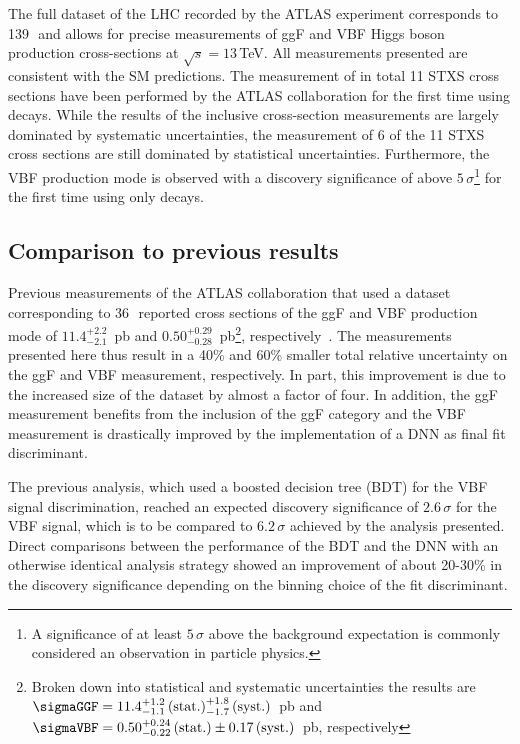 The full \RunTwo dataset of the LHC recorded by the ATLAS experiment corresponds to 139\,\ifb\ and allows for precise measurements of ggF and VBF Higgs boson production cross-sections at $\sqrt{s} = 13\,$TeV.
All measurements presented are consistent with the SM predictions. 
The measurement of in total 11 STXS cross sections have been performed by the ATLAS collaboration for the first time using \HWW decays. 
While the results of the inclusive cross-section measurements are largely dominated by systematic uncertainties, the measurement of 6 of the 11 STXS cross sections are still dominated by statistical uncertainties. 
Furthermore, the VBF production mode is observed with a discovery significance of above $5\,\sigma$\footnote{A significance of at least $5\,\sigma$ above the background expectation is commonly considered an observation in particle physics.} for the first time using only \HWW decays.

\subsection{Comparison to previous results}
Previous \RunTwo measurements of the ATLAS collaboration that used a dataset corresponding to 36\,\ifb\ reported cross sections of the ggF and VBF production mode of $11.4^{+2.2}_{-2.1}$~pb and $0.50^{+0.29}_{-0.28}$~pb\footnote{Broken down into statistical and systematic uncertainties the results are $\sigmaGGF = 11.4^{+1.2}_{-1.1}\,\text{(stat.)}^{+1.8}_{-1.7}\,\text{(syst.)}$~pb and $\sigmaVBF= 0.50^{+0.24}_{-0.22}\,\text{(stat.)}\pm 0.17\,\text{(syst.)}$~pb, respectively}, respectively~\cite{HIGG-2016-07}.
The measurements presented here thus result in a 40\% and 60\% smaller total relative uncertainty on the ggF and VBF measurement, respectively. In part, this improvement is due to the increased size of the dataset by almost a factor of four.
In addition, the ggF measurement benefits from the inclusion of the ggF \TwoJet category and the VBF measurement is drastically improved by the implementation of a DNN as final fit discriminant. 

The previous analysis, which used a boosted decision tree (BDT) for the VBF signal discrimination, reached an expected discovery significance of $2.6\,\sigma$ for the VBF signal, which is to be compared to $6.2\,\sigma$ achieved by the analysis presented. 
Direct comparisons between the performance of the BDT and the DNN with an otherwise identical analysis strategy showed an improvement of about 20-30\% in the discovery significance depending on the binning choice of the fit discriminant. %

